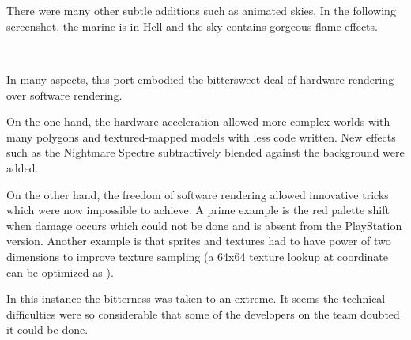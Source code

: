 \\

\\
\par


There were many other subtle additions such as animated skies. In the following screenshot, the marine is in Hell and the sky contains gorgeous flame effects.\\
\par
{}\\
\par
In many aspects, this port embodied the bittersweet deal of hardware rendering over software rendering.\\
\par
On the one hand, the hardware acceleration allowed more complex worlds with many polygons and textured-mapped models with less code written. New effects such as the Nightmare Spectre subtractively blended against the background were added.\\
\par
 On the other hand, the freedom of software rendering allowed innovative tricks which were now impossible to achieve. A prime example is the red palette shift when damage occurs which could not be done and is absent from the PlayStation version. Another example is that sprites and textures had to have power of two dimensions to improve texture sampling (a 64x64 texture lookup at coordinate  can be optimized as ).\\
\par
In this instance the bitterness was taken to an extreme. It seems the technical difficulties were so considerable that some of the developers on the team doubted it could be done.


